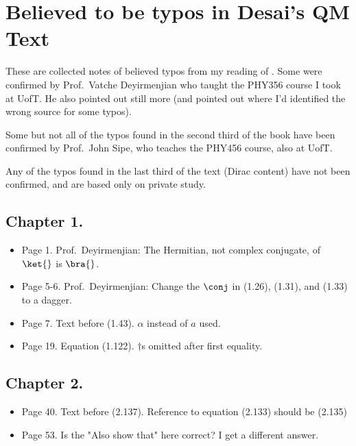 

\label{chap:desaiTypos}
{}
\date{Oct 31, 2010}

\chapter{Believed to be typos in Desai's QM Text}

\beginArtNoToc

These are collected notes of believed typos from my reading of \citep{desai2009quantum}.  Some were confirmed by Prof.\ Vatche Deyirmenjian who taught the PHY356 course I took at UofT.  He also pointed out still more (and pointed out where I'd identified the wrong source for some typos).

Some but not all of the typos found in the second third of the book have been confirmed by Prof.\ John Sipe, who teaches the PHY456 course, also at UofT.

Any of the typos found in the last third of the text (Dirac content) have not been confirmed, and are based only on private study.

\section{Chapter 1.}

\begin{itemize}
\item Page 1.  Prof.\ Deyirmenjian: The Hermitian, not complex conjugate, of $\ket{}$ is $\bra{}$.
\item Page 5-6.  Prof.\ Deyirmenjian: Change the $\conj$ in (1.26), (1.31), and (1.33) to a dagger.
\item Page 7.  Text before (1.43).  $\alpha$ instead of $a$ used.
\item Page 19.  Equation (1.122).  $\dagger$s omitted after first equality.
\end{itemize}

\section{Chapter 2.}
\begin{itemize}
\item Page 40.  Text before (2.137).  Reference to equation (2.133) should be (2.135)
\item Page 53.  Is the "Also show that" here correct?  I get a different answer.
\end{itemize}


